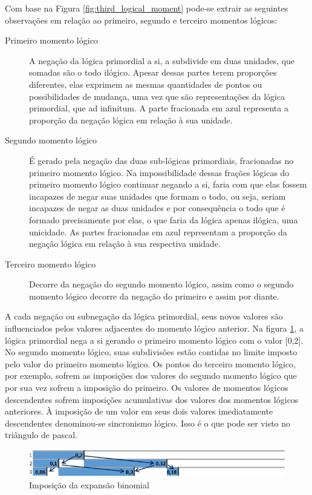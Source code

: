 Com base na Figura \ref{fig:third_logical_moment} pode-se extrair as seguintes observações em relação ao primeiro, segundo e terceiro momentos lógicos:
\begin{description}
   \item[Primeiro momento lógico] A negação da lógica primordial a si, a subdivide em duas unidades, que somadas são o todo ilógico. Apesar dessas partes terem proporções diferentes, elas exprimem as mesmas quantidades de pontos ou possibilidades de mudança, uma vez que são representações da lógica primordial, que ad infinitum. A parte fracionada em azul representa a proporção da negação lógica em relação à sua unidade.
   \item[Segundo momento lógico] É gerado pela negação das duas sub-lógicas primordiais, fracionadas no primeiro momento lógico. Na impossibilidade dessas frações lógicas do primeiro momento lógico continuar negando a si, faria com que elas fossem incapazes de negar suas unidades que formam o todo, ou seja, seriam incapazes de negar as duas unidades e por consequência o todo que é formado precisamente por elas, o que faria da lógica apenas ilógica, uma unicidade. As partes fracionadas em azul representam a proporção da negação lógica em relação à sua respectiva unidade.
   \item[Terceiro momento lógico] Decorre da negação do segundo momento lógico, assim como o segundo momento lógico decorre da negação do primeiro e assim por diante.
\end{description}

A cada negação ou subnegação da lógica primordial, seus novos valores são influenciados pelos valores adjacentes do momento lógico anterior. Na figura \ref{fig:imposition_of_binomial_expansion}, a lógica primordial nega a si gerando o primeiro momento lógico com o valor [0,2].  No segundo momento lógico, suas subdivisões estão contidas no limite imposto pelo valor do primeiro momento lógico. Os pontos do terceiro momento lógico, por exemplo, sofrem as imposições dos valores do segundo momento lógico que por sua vez sofrem a imposição do primeiro. Os valores de momentos lógicos descendentes sofrem imposições acumulativas dos valores dos momentos lógicos anteriores. À imposição de um valor em seus dois valores imediatamente descendentes denominou-se sincronismo lógico. Isso é o que pode ser visto no triângulo de pascal.

\begin{figure}[H]
\caption{Imposição da expansão binomial}
\label{fig:imposition_of_binomial_expansion}
\centering
\includegraphics[scale=.85]{sections/images/imposition_of_binomial_expansion.jpg}
\end{figure}

